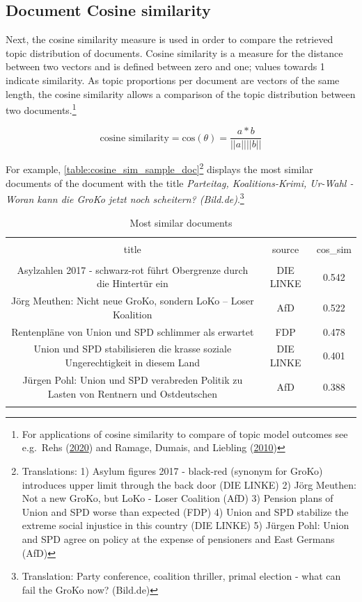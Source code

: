 \documentclass[
]{article}
\begin{document}
\hypertarget{document-cosine-similarity}{%
\subsection{Document Cosine
similarity}\label{document-cosine-similarity}}

Next, the cosine similarity measure is used in order to compare the
retrieved topic distribution of documents. Cosine similarity is a
measure for the distance between two vectors and is defined between zero
and one; values towards 1 indicate similarity. As topic proportions per
document are vectors of the same length, the cosine similarity allows a
comparison of the topic distribution between two documents.\footnote{For
  applications of cosine similarity to compare of topic model outcomes
  see e.g.~Rehs (\protect\hyperlink{ref-rehs_structural_2020}{2020}) and
  Ramage, Dumais, and Liebling
  (\protect\hyperlink{ref-ramage_characterizing_2010}{2010})}

\[
\text{cosine similarity} = \text{cos}(\theta)=\frac{a*b}{||a|| ||b||}
\]

For example, \autoref{table:cosine_sim_sample_doc}\footnote{Translations:
  1) Asylum figures 2017 - black-red (synonym for GroKo) introduces
  upper limit through the back door (DIE LINKE) 2) Jörg Meuthen: Not a
  new GroKo, but LoKo - Loser Coalition (AfD) 3) Pension plans of Union
  and SPD worse than expected (FDP) 4) Union and SPD stabilize the
  extreme social injustice in this country (DIE LINKE) 5) Jürgen Pohl:
  Union and SPD agree on policy at the expense of pensioners and East
  Germans (AfD)} displays the most similar documents of the document
with the title \emph{Parteitag, Koalitions-Krimi, Ur-Wahl - Woran kann
die GroKo jetzt noch scheitern? (Bild.de)}.\footnote{Translation: Party
  conference, coalition thriller, primal election - what can fail the
  GroKo now? (Bild.de)}

\begin{table}[!htbp] \centering 
  \caption{Most similar documents} 
  \label{table:cosine_sim_sample_doc} 
\tiny 
\begin{tabular}{@{\extracolsep{5pt}} ccc} 
\\[-1.8ex]\hline 
\hline \\[-1.8ex] 
title & source & cos\_sim \\ 
\hline \\[-1.8ex] 
Asylzahlen 2017 - schwarz-rot führt Obergrenze durch die Hintertür ein & DIE LINKE & 0.542 \\ 
Jörg Meuthen: Nicht neue GroKo, sondern LoKo – Loser Koalition & AfD & 0.522 \\ 
 Rentenpläne von Union und SPD schlimmer als erwartet & FDP & 0.478 \\ 
Union und SPD stabilisieren die krasse soziale Ungerechtigkeit in diesem Land & DIE LINKE & 0.401 \\ 
Jürgen Pohl: Union und SPD verabreden Politik zu Lasten von Rentnern und Ostdeutschen & AfD & 0.388 \\ 
\hline \\[-1.8ex] 
\end{tabular} 
\end{table}
\end{document}
